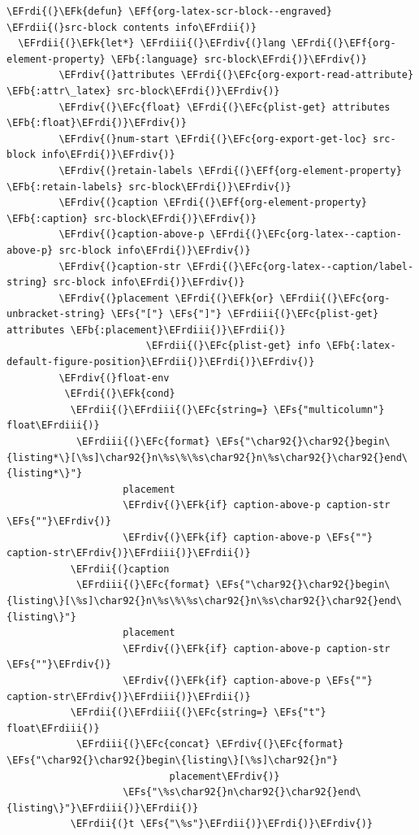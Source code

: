 \documentclass{scrartcl}
\newcommand{\EFk}[1]{\textcolor{EFk}{#1}} %
\newcommand{\EFs}[1]{\textcolor{EFs}{#1}} %
\newcommand{\EFb}[1]{\textcolor{EFb}{#1}} %
\newcommand{\EFc}[1]{\textcolor{EFc}{#1}} %
\newcommand{\EFf}[1]{\textcolor{EFf}{#1}} %
\newcommand{\EFrdi}[1]{#1} %
\newcommand{\EFrdii}[1]{#1} %
\newcommand{\EFrdiii}[1]{#1} %
\newcommand{\EFrdiv}[1]{#1} %
\begin{document}
\begin{Code}
\begin{Verbatim}[]
\EFrdi{(}\EFk{defun} \EFf{org-latex-scr-block--engraved} \EFrdii{(}src-block contents info\EFrdii{)}
  \EFrdii{(}\EFk{let*} \EFrdiii{(}\EFrdiv{(}lang \EFrdi{(}\EFf{org-element-property} \EFb{:language} src-block\EFrdi{)}\EFrdiv{)}
         \EFrdiv{(}attributes \EFrdi{(}\EFc{org-export-read-attribute} \EFb{:attr\_latex} src-block\EFrdi{)}\EFrdiv{)}
         \EFrdiv{(}\EFc{float} \EFrdi{(}\EFc{plist-get} attributes \EFb{:float}\EFrdi{)}\EFrdiv{)}
         \EFrdiv{(}num-start \EFrdi{(}\EFc{org-export-get-loc} src-block info\EFrdi{)}\EFrdiv{)}
         \EFrdiv{(}retain-labels \EFrdi{(}\EFf{org-element-property} \EFb{:retain-labels} src-block\EFrdi{)}\EFrdiv{)}
         \EFrdiv{(}caption \EFrdi{(}\EFf{org-element-property} \EFb{:caption} src-block\EFrdi{)}\EFrdiv{)}
         \EFrdiv{(}caption-above-p \EFrdi{(}\EFc{org-latex--caption-above-p} src-block info\EFrdi{)}\EFrdiv{)}
         \EFrdiv{(}caption-str \EFrdi{(}\EFc{org-latex--caption/label-string} src-block info\EFrdi{)}\EFrdiv{)}
         \EFrdiv{(}placement \EFrdi{(}\EFk{or} \EFrdii{(}\EFc{org-unbracket-string} \EFs{"["} \EFs{"]"} \EFrdiii{(}\EFc{plist-get} attributes \EFb{:placement}\EFrdiii{)}\EFrdii{)}
                        \EFrdii{(}\EFc{plist-get} info \EFb{:latex-default-figure-position}\EFrdii{)}\EFrdi{)}\EFrdiv{)}
         \EFrdiv{(}float-env
          \EFrdi{(}\EFk{cond}
           \EFrdii{(}\EFrdiii{(}\EFc{string=} \EFs{"multicolumn"} float\EFrdiii{)}
            \EFrdiii{(}\EFc{format} \EFs{"\char92{}\char92{}begin\{listing*\}[\%s]\char92{}n\%s\%\%s\char92{}n\%s\char92{}\char92{}end\{listing*\}"}
                    placement
                    \EFrdiv{(}\EFk{if} caption-above-p caption-str \EFs{""}\EFrdiv{)}
                    \EFrdiv{(}\EFk{if} caption-above-p \EFs{""} caption-str\EFrdiv{)}\EFrdiii{)}\EFrdii{)}
           \EFrdii{(}caption
            \EFrdiii{(}\EFc{format} \EFs{"\char92{}\char92{}begin\{listing\}[\%s]\char92{}n\%s\%\%s\char92{}n\%s\char92{}\char92{}end\{listing\}"}
                    placement
                    \EFrdiv{(}\EFk{if} caption-above-p caption-str \EFs{""}\EFrdiv{)}
                    \EFrdiv{(}\EFk{if} caption-above-p \EFs{""} caption-str\EFrdiv{)}\EFrdiii{)}\EFrdii{)}
           \EFrdii{(}\EFrdiii{(}\EFc{string=} \EFs{"t"} float\EFrdiii{)}
            \EFrdiii{(}\EFc{concat} \EFrdiv{(}\EFc{format} \EFs{"\char92{}\char92{}begin\{listing\}[\%s]\char92{}n"}
                            placement\EFrdiv{)}
                    \EFs{"\%s\char92{}n\char92{}\char92{}end\{listing\}"}\EFrdiii{)}\EFrdii{)}
           \EFrdii{(}t \EFs{"\%s"}\EFrdii{)}\EFrdi{)}\EFrdiv{)}

\end{Verbatim}
\end{Code}
\end{document}
